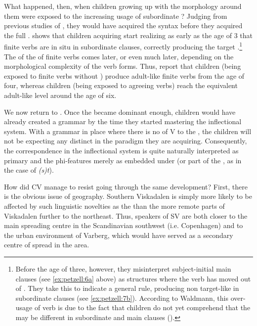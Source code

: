 \documentclass[output=paper,colorlinks,citecolor=brown,draft,draftmode]{langscibook}
\begin{document}
What happened, then, when children growing up with the  morphology around them were exposed to the increasing usage of subordinate ? Judging from previous studies of , they would have acquired the syntax before they acquired the full . \citet{Waldmann2014} shows that children acquiring  start realizing as early as the age of 3 that finite verbs are in situ in subordinate clauses, correctly producing the target .\footnote{Before the age of three, however, they misinterpret subject-initial main clauses (see \ref{ex:petzell:6a} above) as  structures where the verb has moved out of . They take this to indicate a general  rule, producing non target-like  in subordinate clauses (see \ref{ex:petzell:7b}). According to Waldmann, this over-usage of verb  is due to the fact that children do not yet comprehend that the  may be different in subordinate and main clauses (\citeyear[62–65]{Waldmann2014}).} The  of the  of finite verbs comes later, or even much later, depending on the morphological complexity of the verb forms. Thus, \citet{RagnarsdottirEtAl1999} report that  children (being exposed to finite verbs without ) produce adult-like finite verbs from the age of four, whereas  children (being exposed to agreeing verbs) reach the equivalent adult-like level around the age of six.



We now return to . Once the  became dominant enough, children would have already created a  grammar by the time they started mastering the inflectional system. With a grammar in place where there is no  of V to the , the children will not be expecting any distinct  in the paradigm they are acquiring. Consequently, the  correspondence in the inflectional system is quite naturally interpreted as primary and the phi-features merely as embedded under  (or part of the , as in the case of \textit{(s)t}).



How did CV manage to resist going through the same development? First, there is the obvious issue of geography. Southern Viskadalen is simply more likely to be affected by such linguistic novelties as the  than the more remote parts of Viskadalen further to the northeast. Thus, speakers of SV are both closer to the main spreading centre in the Scandinavian southwest (i.e. Copenhagen) and to the urban environment of Varberg, which would have served as a secondary centre of spread in the area. 
\end{document}
